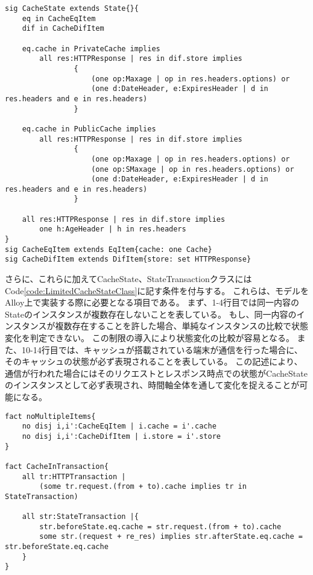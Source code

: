 \documentclass[journal]{IEEEtran}
\begin{document}
\begin{lstlisting}[caption=キャッシュの状態を表すクラス, label=code:CacheStateClass]
sig CacheState extends State{}{
	eq in CacheEqItem
	dif in CacheDifItem

	eq.cache in PrivateCache implies
        all res:HTTPResponse | res in dif.store implies
                {
                    (one op:Maxage | op in res.headers.options) or
                    (one d:DateHeader, e:ExpiresHeader | d in res.headers and e in res.headers)
                }

    eq.cache in PublicCache implies
        all res:HTTPResponse | res in dif.store implies
                {
                    (one op:Maxage | op in res.headers.options) or
                    (one op:SMaxage | op in res.headers.options) or
                    (one d:DateHeader, e:ExpiresHeader | d in res.headers and e in res.headers)
                }

    all res:HTTPResponse | res in dif.store implies
        one h:AgeHeader | h in res.headers
}
sig CacheEqItem extends EqItem{cache: one Cache}
sig CacheDifItem extends DifItem{store: set HTTPResponse}
\end{lstlisting}

さらに、これらに加えてCacheState、StateTransactionクラスにはCode\ref{code:LimitedCacheStateClass}に記す条件を付与する。
これらは、モデルをAlloy上で実装する際に必要となる項目である。
まず、1-4行目では同一内容のStateのインスタンスが複数存在しないことを表している。
もし、同一内容のインスタンスが複数存在することを許した場合、単純なインスタンスの比較で状態変化を判定できない。
この制限の導入により状態変化の比較が容易となる。
また、10-14行目では、キャッシュが搭載されている端末が通信を行った場合に、そのキャッシュの状態が必ず表現されることを表している。
この記述により、通信が行われた場合にはそのリクエストとレスポンス時点での状態がCacheStateのインスタンスとして必ず表現され、時間軸全体を通して変化を捉えることが可能になる。
\begin{lstlisting}[caption=CacheStateクラスの制限, label=code:LimitedCacheStateClass]
fact noMultipleItems{
	no disj i,i':CacheEqItem | i.cache = i'.cache
	no disj i,i':CacheDifItem | i.store = i'.store
}

fact CacheInTransaction{
	all tr:HTTPTransaction |
		(some tr.request.(from + to).cache implies tr in StateTransaction)

	all str:StateTransaction |{
		str.beforeState.eq.cache = str.request.(from + to).cache
		some str.(request + re_res) implies str.afterState.eq.cache = str.beforeState.eq.cache
	}
}
\end{lstlisting}
\end{document}
